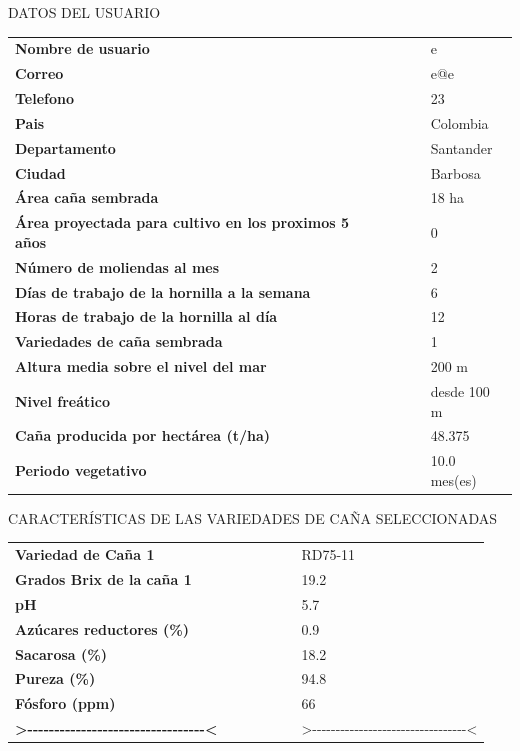 \documentclass{article}%
\begin{document}
\newpage%
\begin{center}%
\begin{Huge}%
DATOS DEL USUARIO%
\end{Huge}%
\linebreak%
\end{center}%
\begin{tabular}{lccccl}%
\textbf{Nombre de usuario}& & & & &e\\%
\textbf{Correo}& & & & &e@e\\%
\textbf{Telefono}& & & & &23\\%
\textbf{Pais}& & & & &Colombia\\%
\textbf{Departamento}& & & & &Santander\\%
\textbf{Ciudad}& & & & &Barbosa\\%
\textbf{Área caña sembrada}& & & & &18 ha\\%
\textbf{Área proyectada para cultivo en los proximos 5 años}& & & & &0\\%
\textbf{Número de moliendas al mes}& & & & &2\\%
\textbf{Días de trabajo de la hornilla a la semana}& & & & &6\\%
\textbf{Horas de trabajo de la hornilla al día}& & & & &12\\%
\textbf{Variedades de caña sembrada}& & & & &1\\%
\textbf{Altura media sobre el nivel del mar}& & & & &200 m\\%
\textbf{Nivel freático}& & & & &desde 100 m\\%
\textbf{Caña producida por hectárea (t/ha)}& & & & &48.375\\%
\textbf{Periodo vegetativo}& & & & &10.0 mes(es)\\%
\end{tabular}%
\newpage%
\begin{center}%
\begin{Huge}%
CARACTERÍSTICAS DE LAS VARIEDADES DE CAÑA SELECCIONADAS%
\end{Huge}%
\linebreak%
\end{center}%
\begin{tabular}{lcccccl}%
\textbf{Variedad de Caña 1}& & & & & &RD75{-}11\\%
\textbf{Grados Brix de la caña 1}& & & & & &19.2\\%
\textbf{pH}& & & & & &5.7\\%
\textbf{Azúcares reductores (\%)}& & & & & &0.9\\%
\textbf{Sacarosa (\%)}& & & & & &18.2\\%
\textbf{Pureza (\%)}& & & & & &94.8\\%
\textbf{Fósforo (ppm)}& & & & & &66\\%
\textbf{>{-}{-}{-}{-}{-}{-}{-}{-}{-}{-}{-}{-}{-}{-}{-}{-}{-}{-}{-}{-}{-}{-}{-}{-}{-}{-}{-}{-}{-}{-}{-}{-}{-}<}& & & & & &>{-}{-}{-}{-}{-}{-}{-}{-}{-}{-}{-}{-}{-}{-}{-}{-}{-}{-}{-}{-}{-}{-}{-}{-}{-}{-}{-}{-}{-}{-}{-}{-}{-}<\\%
\end{tabular}%
\linebreak%
\newline%
%
\linebreak%
\end{document}

